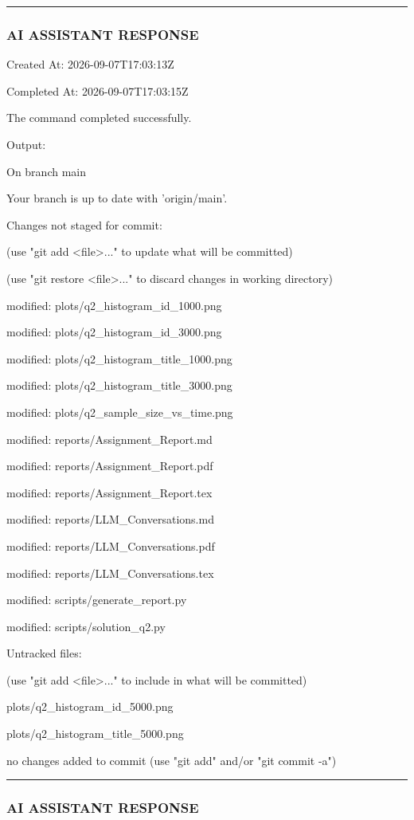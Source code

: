 \documentclass[11pt,a4paper]{article}
\begin{document}
\hrule

\subsubsection{AI ASSISTANT RESPONSE}

Created At: 2026-09-07T17:03:13Z

Completed At: 2026-09-07T17:03:15Z


The command completed successfully.

Output:

On branch main

Your branch is up to date with 'origin/main'.


Changes not staged for commit:

(use "git add <file>..." to update what will be committed)

(use "git restore <file>..." to discard changes in working directory)

modified:   plots/q2\_histogram\_id\_1000.png

modified:   plots/q2\_histogram\_id\_3000.png

modified:   plots/q2\_histogram\_title\_1000.png

modified:   plots/q2\_histogram\_title\_3000.png

modified:   plots/q2\_sample\_size\_vs\_time.png

modified:   reports/Assignment\_Report.md

modified:   reports/Assignment\_Report.pdf

modified:   reports/Assignment\_Report.tex

modified:   reports/LLM\_Conversations.md

modified:   reports/LLM\_Conversations.pdf

modified:   reports/LLM\_Conversations.tex

modified:   scripts/generate\_report.py

modified:   scripts/solution\_q2.py


Untracked files:

(use "git add <file>..." to include in what will be committed)

plots/q2\_histogram\_id\_5000.png

plots/q2\_histogram\_title\_5000.png


no changes added to commit (use "git add" and/or "git commit -a")


\hrule

\subsubsection{AI ASSISTANT RESPONSE}
\end{document}
